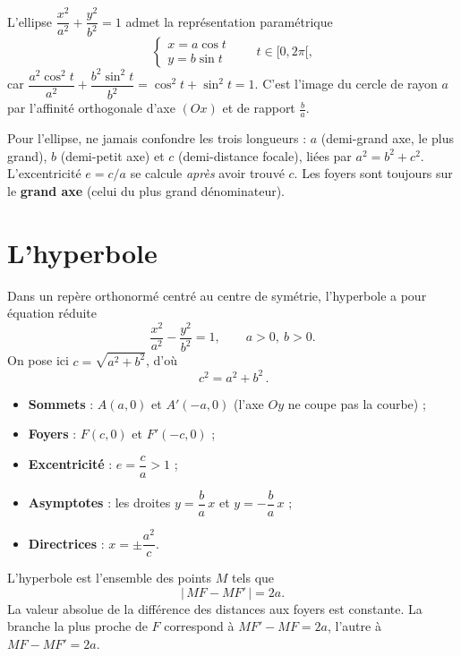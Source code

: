 \begin{remarque}
L'ellipse $\dfrac{x^{2}}{a^{2}}+\dfrac{y^{2}}{b^{2}}=1$ admet la représentation paramétrique
\[
\begin{cases}x=a\cos t\\ y=b\sin t\end{cases}\qquad t\in[0,2\pi[,
\]
car $\dfrac{a^{2}\cos^{2}t}{a^{2}}+\dfrac{b^{2}\sin^{2}t}{b^{2}}=\cos^{2}t+\sin^{2}t=1$.
C'est l'image du cercle de rayon $a$ par l'affinité orthogonale d'axe $(Ox)$ et de rapport
$\tfrac ba$.
\end{remarque}

\begin{aretenir}
Pour l'ellipse, ne jamais confondre les trois longueurs : $a$ (demi-grand axe, le plus
grand), $b$ (demi-petit axe) et $c$ (demi-distance focale), liées par
$a^{2}=b^{2}+c^{2}$. L'excentricité $e=c/a$ se calcule \emph{après} avoir trouvé $c$. Les
foyers sont toujours sur le \textbf{grand axe} (celui du plus grand dénominateur).
\end{aretenir}

\section{L'hyperbole}

\begin{theoreme}
Dans un repère orthonormé centré au centre de symétrie, l'hyperbole a pour équation réduite
\[
\frac{x^{2}}{a^{2}}-\frac{y^{2}}{b^{2}}=1,\qquad a>0,\ b>0.
\]
On pose ici $c=\sqrt{a^{2}+b^{2}}$, d'où
\[
\boxed{\,c^{2}=a^{2}+b^{2}\,}.
\]
\begin{itemize}
\item \textbf{Sommets} : $A(a,0)$ et $A'(-a,0)$ (l'axe $Oy$ ne coupe pas la courbe) ;
\item \textbf{Foyers} : $F(c,0)$ et $F'(-c,0)$ ;
\item \textbf{Excentricité} : $e=\dfrac ca>1$ ;
\item \textbf{Asymptotes} : les droites $y=\dfrac ba\,x$ et $y=-\dfrac ba\,x$ ;
\item \textbf{Directrices} : $x=\pm\dfrac{a^{2}}c$.
\end{itemize}
\end{theoreme}

\begin{propriete}
L'hyperbole est l'ensemble des points $M$ tels que
\[
\big|\,MF-MF'\,\big|=2a.
\]
La valeur absolue de la différence des distances aux foyers est constante. La branche la
plus proche de $F$ correspond à $MF'-MF=2a$, l'autre à $MF-MF'=2a$.
\end{propriete}

